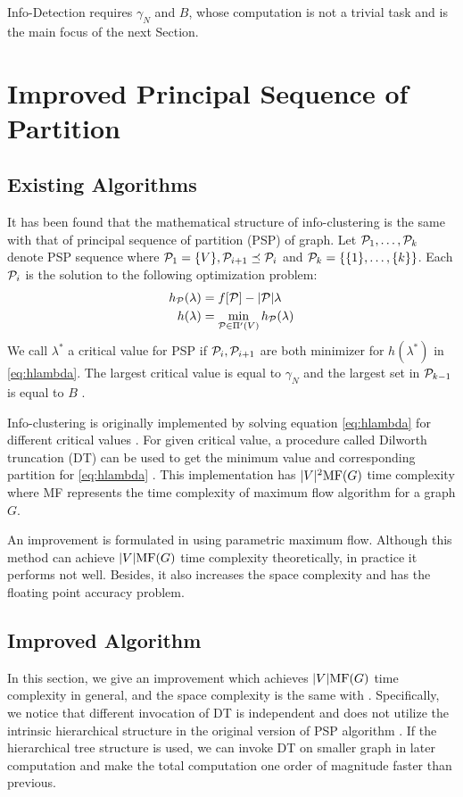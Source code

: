 \documentclass[runningheads]{llncs}
\begin{document}
Info-Detection requires $\gamma_N$ and $B$, whose computation is not a trivial task and is the main focus of the next Section.

\section{Improved Principal Sequence of Partition}\label{sec:Alg}
\subsection{Existing Algorithms}
It has been found that the mathematical structure of info-clustering is the same with that of principal sequence of partition (PSP) of graph. Let $\P_1, \dots, \P_k$ denote PSP sequence where $\P_1 = \{V\}, \P_{i+1} \preceq \P_i$ and $\P_k = \{\{1\},\dots,\{k\}\}$.
Each $\P_i$ is the solution to the following optimization problem:
\begin{align}
h_{\P}(\lambda) &=  f[\P] - \abs{\P} \lambda  \label{eq:hPL}\\
h(\lambda) &= \min_{\P \in \Pi'(V)} h_{\P}(\lambda) \label{eq:hlambda}
\end{align}
We call $\lambda^*$ a critical value for PSP if $\P_i, \P_{i+1}$ are both minimizer for $h(\lambda^*)$ in \eqref{eq:hlambda}.
The largest critical value is equal to $\gamma_N$ and the largest set in $\P_{k-1}$ is equal to $B$ \cite{RN1}.

Info-clustering is originally implemented by solving equation \eqref{eq:hlambda} for different critical values \cite{RN3}. For given critical value, a procedure called Dilworth truncation (DT) can be used to get the minimum value and corresponding partition for \eqref{eq:hlambda} \cite{RN3}. This implementation has $\abs{V}^2 \textrm{MF}(G)$ time complexity where \textrm{MF} represents the time complexity of maximum flow algorithm for a graph $G$.

An improvement is formulated in \cite{RN4} using parametric maximum flow. Although this method can achieve $\abs{V} \textrm{MF}(G)$ time complexity theoretically, in practice it performs not well. Besides, it also increases the space complexity and has the floating point accuracy problem.

\subsection{Improved Algorithm} 
In this section, we give an improvement which achieves $\abs{V} \textrm{MF}(G)$ time complexity in general, and the space complexity is the same with \cite{RN4}. Specifically,
we notice that different invocation of DT is independent and does not utilize the intrinsic hierarchical structure in the original version of PSP algorithm \cite{RN3}. If the hierarchical tree structure is used, we can invoke DT on smaller graph in later computation and make the total computation one order of magnitude faster than previous.
\end{document}
